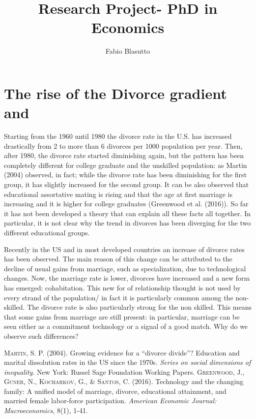 \documentclass[12pt]{article} %
\title{Research Project- PhD in Economics}
\author{Fabio Blasutto}
\begin{document}
	\maketitle
	

\section{The rise of the Divorce gradient and}

Starting from the 1960 until 1980 the divorce rate in the U.S. has increased drastically from 2 to more than 6 divorces per 1000 population per year. Then, after 1980, the divorce rate started diminishing again, but the pattern has been completely different for college graduate and the unskilled population: as Martin (2004) observed, in fact; while the divorce rate has been diminishing for the first group, it has slightly increased for the second group. It can be also observed that educational assortative mating is rising and that the age at first marriage is increasing and it is higher for college graduates (Greenwood et al. (2016)). So far it has not been developed a theory that can explain all these facts all together. In particular, it is not clear why the trend in divorces has been diverging for the two different educational groups.

Recently in the US and in most developed countries an increase of divorce rates has been observed. The main reason of this change can be attributed to the decline of usual gains from marriage, such as specialization, due to technological changes. Now, the marriage rate is lower, divorces have increased and a new form has emerged: cohabitation. This new for of relationship thought is not used by every strand of the population/ in fact it is particularly common among the non-skilled. The divorce rate is also particularly strong for the non skilled. This means that some gains from marriage are still present: in particular, marriage can be seen either as a commitment technology or a signal of a good match. Why do we observe such differences? 
\\
\begin{thebibliography}{widestlabel}
	
\textsc{Martin, S. P.} (2004). Growing evidence for a “divorce divide”? Education and marital dissolution rates in the US since the 1970s. \textit{Series on social dimensions of inequality}. New York: Russel Sage Foundation Working Papers.
 \textsc{Greenwood, J., Guner, N., Kocharkov, G., \& Santos}, C. (2016). Technology and the changing family: A unified model of marriage, divorce, educational attainment, and married female labor-force participation. \textit{American Economic Journal: Macroeconomics}, 8(1), 1-41.
\end{thebibliography}
\end{document}
